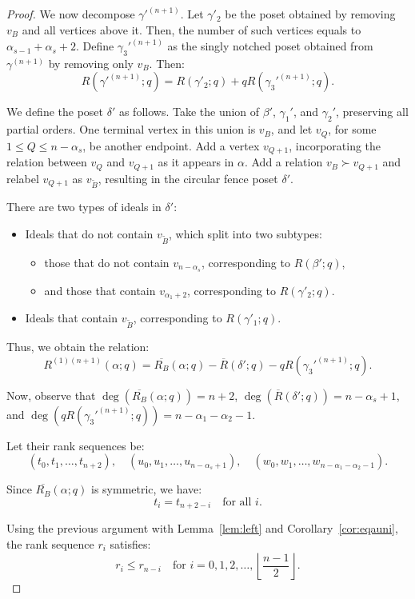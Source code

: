 \documentclass{article}
\theoremstyle{remark}
\begin{document}
\begin{proof}
We now decompose \( \gamma'^{(n+1)} \). Let \( \gamma'_2 \) be the poset obtained by removing \( v_B \) and all vertices above it. Then, the number of such vertices equals to $\alpha_{s-1}+\alpha_s+2$. Define \( \gamma_3'^{(n+1)} \) as the singly notched poset obtained from \( \gamma^{(n+1)} \) by removing only \( v_B \). Then:
\[
R(\gamma'^{(n+1)}; q) =  R(\gamma'_2; q) + qR(\gamma_3'^{(n+1)}; q).
\]


We define the poset \( \delta' \) as follows. Take the union of \( \beta' \), \( \gamma_1' \), and \( \gamma_2' \), preserving all partial orders. One terminal vertex in this union is \( v_B \), and let \( v_Q \), for some \( 1 \leq Q \leq n - \alpha_s \), be another endpoint. Add a vertex \( v_{Q+1} \), incorporating the relation between \( v_Q \) and \( v_{Q+1} \) as it appears in \( \alpha \). Add a relation \( v_{B} \succ v_{Q+1} \) and relabel $v_{Q+1}$ as \( v_{\tilde{B}} \), resulting in the circular fence poset \( \delta' \).

There are two types of ideals in \( \delta' \):
\begin{itemize}
    \item Ideals that do not contain \( v_{\tilde{B}} \), which split into two subtypes:
        \begin{itemize}
            \item those that do not contain \( v_{n-\alpha_s} \), corresponding to \( R(\beta'; q) \),
            \item and those that contain \( v_{\alpha_1 + 2} \), corresponding to \( R(\gamma'_2; q) \).
        \end{itemize}
    \item Ideals that contain \( v_{\tilde{B}} \), corresponding to \( R(\gamma'_1; q) \).
\end{itemize}

Thus, we obtain the relation:
\[
R^{(1)(n+1)}(\alpha; q) = \overline{R_B}(\alpha; q) - \overline{R}(\delta'; q) - q R(\gamma_3'^{(n+1)}; q).
\]


Now, observe that \( \deg(\overline{R_B}(\alpha; q)) = n + 2 \), \( \deg(\overline{R}(\delta'; q)) = n - \alpha_s + 1\), and \(\deg(qR(\gamma_3'^{(n+1)};q))=n-\alpha_1-\alpha_2-1\). 

Let their rank sequences be:
\[
(t_0, t_1, \ldots, t_{n+2}), \quad (u_0, u_1, \ldots, u_{n - \alpha_s + 1}), \quad (w_0, w_1, \ldots, w_{n - \alpha_1-\alpha_2-1}).
\]

    Since \( \overline{R_B}(\alpha;q) \) is symmetric, we have:
    \[
    t_i = t_{n + 2 - i} \quad \text{for all } i.
    \]

Using the previous argument with Lemma~\ref{lem:left} and Corollary~\ref{cor:eqauni}, the rank sequence \( r_i \) satisfies:
    \[
    r_i \leq r_{n  - i} \quad \text{for } i = 0,1, 2, \ldots, \left\lfloor \frac{n-1}{2} \right\rfloor.
    \]

\end{proof}
\end{document}
